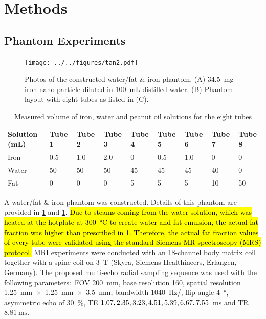 \documentclass[journal,twoside,web]{ieeecolor}
\newcommand{\splitatcommas}[1]{%
	\begingroup
	\begingroup\lccode`~=`, \lowercase{\endgroup
		\edef~{\mathchar\the\mathcode`, \penalty0 \noexpand\hspace{0pt plus 1em}}%
	}\mathcode`,="8000 #1%
	\endgroup
}
\begin{document}
\section{Methods}

\subsection{Phantom Experiments}

\begin{figure}
	\centering
	\texttt{[image: ../../figures/tan2.pdf]}
	\caption{Photos of the constructed water/fat \& iron phantom. 
			(A) 34.5~mg iron nano particle diluted in 100~mL distilled water.
			(B) Phantom layout with eight tubes as listed in (C).}
	\label{FIG:PHA_WFIRON}
\end{figure}

\begin{table}[t]
	\caption{Measured volume of iron, water and peanut oil solutions for the eight tubes}
	\setlength{\tabcolsep}{3pt}
	\begin{tabular}{m{} m{} m{} m{} m{} m{} m{} m{} m{}}
			\toprule
			Solution (\si{\milli\liter}) & Tube 1 & Tube 2 & Tube 3 & Tube 4 & Tube 5 & Tube 6 & Tube 7 & Tube 8 \\
			\hline
			Iron  &  0.5 &  1.0 &  2.0 &  0 &  0.5 &  1.0 &  0 &  0 \\
			Water & 50   & 50   & 50   & 45 & 45   & 45   & 40 &  0 \\
			Fat   &  0   &  0   &  0   &  5 &  5   &  5   & 10 & 50 \\
			\bottomrule
		\end{tabular}
	\label{TAB:PHA}
\end{table}

A water/fat \& iron phantom \cite{hines_2009_wfiron,bush_2018_fat} was constructed. 
Details of this phantom are provided in \cref{FIG:PHA_WFIRON} and \cref{TAB:PHA}. 
\hl{Due to steams coming from the water solution, 
which was heated at the hotplate at \mbox{\SI{300}{\celsius}} 
to create water and fat emulsion, 
the actual fat fraction was higher than prescribed in \mbox{\cref{TAB:PHA}}. 
Therefore, the actual fat fraction values of every tube were validated using 
the standard Siemens MR spectroscopy (MRS) protocol.} 
MRI experiments were conducted with an 18-channel body matrix coil 
together with a spine coil on 
\SI{3}{\tesla} (Skyra, Siemens Healthineers, Erlangen, Germany). 
The proposed multi-echo radial sampling sequence was used 
with the following parameters:~FOV \SI{200}{\milli\metre}, 
base resolution 160, spatial resolution 
\SI{1.25}{\milli\meter}~$\times$~\SI{1.25}{\milli\meter}~$\times$~\SI{3.5}{\milli\meter},
bandwidth \SI{1040}{\hertz/\pixel}, flip angle \SI{4}{\degree}, 
asymmetric echo \cite{untenberger_2016_asym} of \SI{30}{\percent}, 
TE $\splitatcommas{1.07, 2.35, 3.23, 4.51, 5.39, 6.67, 7.55}$~\si{\ms} 
and TR $\SI{8.81}{\ms}$. 
\end{document}
